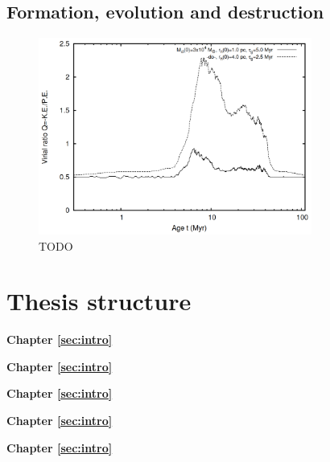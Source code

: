 \subsection{Formation, evolution and destruction}
\label{sec:intro:theory:evolution}

\begin{figure}[tb]
	\centering
	\includegraphics[width=0.8\textwidth]{fig/c1/virialisation_placid_gas_expulsion.png}
	\caption[TODO]{TODO}
	\label{fig:intro:theory:feedback}
\end{figure}


\section{Thesis structure}
\label{sec:intro:structure}

\textbf{Chapter \ref{sec:intro}} \\[0.2em]
\blindtext

\textbf{Chapter \ref{sec:intro}} \\[0.2em]
\blindtext

\textbf{Chapter \ref{sec:intro}} \\[0.2em]
\blindtext

\textbf{Chapter \ref{sec:intro}} \\[0.2em]
\blindtext

\textbf{Chapter \ref{sec:intro}} \\[0.2em]
\blindtext
